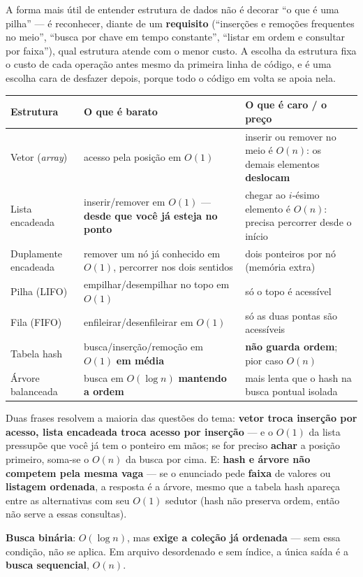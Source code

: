 \begin{conceito}
A forma mais útil de entender estrutura de dados não é decorar “o que é
uma pilha” --- é reconhecer, diante de um \textbf{requisito}
(“inserções e remoções frequentes no meio”, “busca por chave em tempo
constante”, “listar em ordem e consultar por faixa”), qual estrutura
atende com o menor custo. A escolha da estrutura fixa o custo de cada
operação antes mesmo da primeira linha de código, e é uma escolha cara de
desfazer depois, porque todo o código em volta se apoia nela.

\begin{center}
\begin{tabular}{@{}p{2.9cm}p{4.2cm}p{4.4cm}@{}}
\toprule
\textbf{Estrutura} & \textbf{O que é barato} & \textbf{O que é caro / o
preço} \\
\midrule
Vetor (\textit{array}) & acesso pela posição em $O(1)$ & inserir ou
remover no meio é $O(n)$: os demais elementos \textbf{deslocam} \\
Lista encadeada & inserir/remover em $O(1)$ --- \textbf{desde que você já
esteja no ponto} & chegar ao $i$-ésimo elemento é $O(n)$: precisa
percorrer desde o início \\
Duplamente encadeada & remover um nó já conhecido em $O(1)$, percorrer
nos dois sentidos & dois ponteiros por nó (memória extra) \\
Pilha (LIFO) & empilhar/desempilhar no topo em $O(1)$ & só o topo é
acessível \\
Fila (FIFO) & enfileirar/desenfileirar em $O(1)$ & só as duas pontas são
acessíveis \\
Tabela hash & busca/inserção/remoção em $O(1)$ \textbf{em média} &
\textbf{não guarda ordem}; pior caso $O(n)$ \\
Árvore balanceada & busca em $O(\log n)$ \textbf{mantendo a ordem} & mais
lenta que o hash na busca pontual isolada \\
\bottomrule
\end{tabular}
\end{center}

Duas frases resolvem a maioria das questões do tema: \textbf{vetor troca
inserção por acesso, lista encadeada troca acesso por inserção} --- e o
$O(1)$ da lista pressupõe que você já tem o ponteiro em mãos; se for
preciso \textbf{achar} a posição primeiro, soma-se o $O(n)$ da busca por
cima. E: \textbf{hash e árvore não competem pela mesma vaga} --- se o
enunciado pede \textbf{faixa} de valores ou \textbf{listagem ordenada}, a
resposta é a árvore, mesmo que a tabela hash apareça entre as alternativas
com seu $O(1)$ sedutor (hash não preserva ordem, então não serve a essas
consultas).

\textbf{Busca binária}: $O(\log n)$, mas \textbf{exige a coleção já
ordenada} --- sem essa condição, não se aplica. Em arquivo desordenado e
sem índice, a única saída é a \textbf{busca sequencial}, $O(n)$.
\end{conceito}

